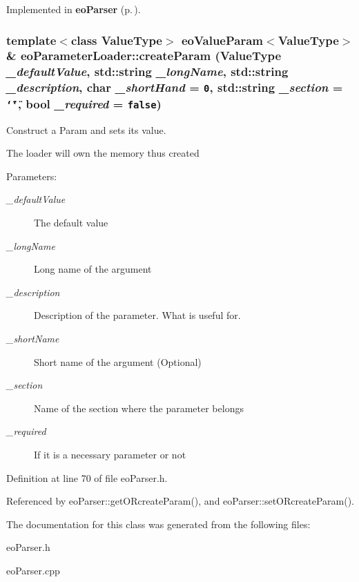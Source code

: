 Implemented in {\bf eo\-Parser} {\rm (p.\,\pageref{classeo_parser_a1})}.
\subsubsection{\setlength{\rightskip}{0pt plus 5cm}template$<$class Value\-Type$>$ {\bf eo\-Value\-Param}$<$Value\-Type$>$\& eo\-Parameter\-Loader::create\-Param (Value\-Type {\em \_\-default\-Value}, std::string {\em \_\-long\-Name}, std::string {\em \_\-description}, char {\em \_\-short\-Hand} = {\tt 0}, std::string {\em \_\-section} = {\tt \char`\"{}\char`\"{}}, bool {\em \_\-required} = {\tt false})\hspace{0.3cm}{\tt  [inline]}}\label{classeo_parameter_loader_a3}


Construct a Param and sets its value. 

The loader will own the memory thus created

\begin{Desc}
\item[Parameters:]
\begin{description}
\item[{\em \_\-default\-Value}]The default value \item[{\em \_\-long\-Name}]Long name of the argument \item[{\em \_\-description}]Description of the parameter. What is useful for. \item[{\em \_\-short\-Name}]Short name of the argument (Optional) \item[{\em \_\-section}]Name of the section where the parameter belongs \item[{\em \_\-required}]If it is a necessary parameter or not \end{description}
\end{Desc}


Definition at line 70 of file eo\-Parser.h.

Referenced by eo\-Parser::get\-ORcreate\-Param(), and eo\-Parser::set\-ORcreate\-Param().

The documentation for this class was generated from the following files:\begin{CompactItemize}
\item 
eo\-Parser.h\item 
eo\-Parser.cpp\end{CompactItemize}
